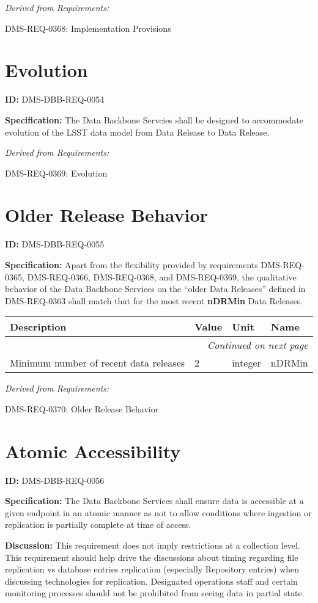 \documentclass[SE,toc,lsstdraft]{lsstdoc}
\makeatletter
\newcommand{\paramname}[1]{\hspace{0pt}#1}
\newcommand{\unitname}[1]{\hspace{0pt}#1}
\newcommand{\addendum}{}
\newenvironment{parameters}[0]{%
\setlength\LTleft{0pt}
\setlength\LTright{\fill}
\begin{small}
\begin{longtable}[]{|p{0.49\textwidth}|l|p{0.6in}|p{1.70in}@{}|}

\hline \textbf{Description} & \textbf{Value} & \textbf{Unit} & \textbf{Name} \\ \hline
\endhead

\hline \multicolumn{4}{r}{\emph{Continued on next page}} \\
\endfoot

\hline\hline
\endlastfoot
}{%
\hline
\end{longtable}
\end{small}
}
\makeatother
\begin{document}
\emph{Derived from Requirements:}

DMS-REQ-0368:
Implementation Provisions \newline

\section{Evolution}

\label{DMS-DBB-REQ-0054}
\textbf{ID:} DMS-DBB-REQ-0054

\textbf{Specification:}
The Data Backbone Servcies shall be designed to accommodate evolution of the LSST data model from Data Release to Data Release.

\emph{Derived from Requirements:}

DMS-REQ-0369:
Evolution \newline

\section{Older Release Behavior}

\label{DMS-DBB-REQ-0055}
\textbf{ID:} DMS-DBB-REQ-0055

\textbf{Specification:}
Apart from the flexibility provided by requirements DMS-REQ-0365, DMS-REQ-0366, DMS-REQ-0368, and DMS-REQ-0369, the qualitative behavior of the Data Backbone Services on the “older Data Releases” defined in DMS-REQ-0363 shall match that for the most recent \textbf{nDRMin} Data Releases.

\begin{parameters}
Minimum number of recent data releases
&
2
&
\unitname{%
integer
}
&
\paramname{%
nDRMin
} \\\hline
\end{parameters}

\emph{Derived from Requirements:}

DMS-REQ-0370:
Older Release Behavior \newline

\section{Atomic Accessibility}

\label{DMS-DBB-REQ-0056}
\textbf{ID:} DMS-DBB-REQ-0056

\textbf{Specification:}
The Data Backbone Services shall ensure data is accessible at a given endpoint in an atomic manner as not to allow conditions where ingestion or replication is partially complete at time of access.

\textbf{Discussion:}
This requirement does not imply restrictions at a collection level.  This requirement should help drive the discussions about timing regarding file replication vs database entries replication (especially Repository entries) when discussing technologies for replication.    Designated operations staff and certain monitoring processes should not be prohibited from seeing data in partial state.

\addendum


\end{document}
